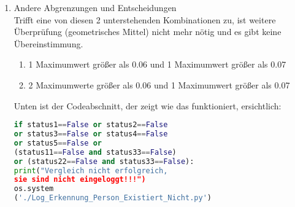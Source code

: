 \begin{enumerate}
\begin{itemize}
\begin{enumerate}
\begin{enumerate}
				\begin{figure}[H]
				\centering
				\texttt{[image: \\ordnerfigures 3\_Fall.png]}
				\caption{3\_Fall}
				\label{fig:3_Fall}
			\end{figure}
			
			Trifft dieser Bedienung zu, stimmt die Erkennung nicht und der Person wird nicht vom System erkannt.\\
			
			Auf Abbildung \ref{fig:3_Fall} ist ein Flussdiagramm dargestellt, das die Abfolge dieser Bedingung beschreibt.\\
			
			Unten ist der Codeabschnitt, der zeigt wie das funktioniert, ersichtlich:\\
			
\begin{lstlisting}[language=Python]
for i in range(0,len(MAX)):
if MAX[i] > 0.084:
count+=1
status5=True
#Wenn JA: FALSCH
if count >=1:
global status5
status5=False
\end{lstlisting}
			
		\end{enumerate} 
	
		\item Andere Abgrenzungen und Entscheidungen \\
		
		Trifft eine von diesen 2 unterstehenden Kombinationen zu, ist weitere Überprüfung (geometrisches Mittel) nicht mehr nötig und es gibt keine Übereinstimmung.
		\begin{enumerate}
			\item 1 Maximumwert größer als 0.06 und 1 Maximumwert größer als 0.07 \\
			\item 2 Maximumwerte größer als 0.06 und 1 Maximumwert größer als 0.07 \\
		\end{enumerate}
	
		Unten ist der Codeabschnitt, der zeigt wie das funktioniert, ersichtlich:\\
	
\begin{lstlisting}[language=Python]
if status1==False or status2==False 
or status3==False or status4==False 
or status5==False or
(status11==False and status33==False) 
or (status22==False and status33==False):
print("Vergleich nicht erfolgreich, 
sie sind nicht eingeloggt!!!")
os.system
('./Log_Erkennung_Person_Existiert_Nicht.py')
\end{lstlisting}
		

\end{enumerate}
\end{itemize}
\end{enumerate}
